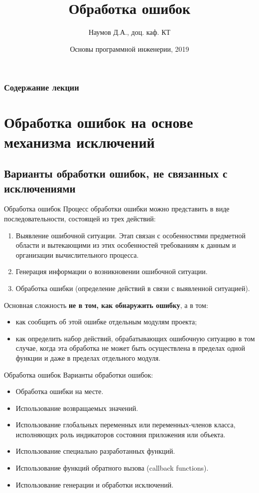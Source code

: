 \documentclass{beamer}
\title[Software Design]{Обработка ошибок}
\author{Наумов Д.А., доц. каф. КТ}
\date[21.10.2019] {Основы программной инженерии, 2019}
\begin{document}
\begin{frame}
  \titlepage
\end{frame}
  
\begin{frame}
  \frametitle{Содержание лекции}
  \tableofcontents  
\end{frame}

\section{Обработка ошибок на основе механизма исключений}

\subsection{Варианты обработки ошибок, не связанных с исключениями}

\begin{frame}{Обработка ошибок}
Процесс обработки ошибки можно представить в виде последовательности, состоящей из трех действий:
\begin{enumerate}
\item Выявление ошибочной ситуации. Этап связан с особенностями предметной области и вытекающими из этих особенностей требованиям к данным и организации вычислительного процесса.
\item Генерация информации о возникновении ошибочной ситуации.
\item Обработка ошибки (определение действий в связи с выявленной ситуацией).
\end{enumerate}
Основная сложность \textbf{не в том, как обнаружить ошибку}, а в том:
\begin{itemize}
\item как сообщить об этой ошибке отдельным модулям проекта;
\item как определить набор действий, обрабатывающих ошибочную ситуацию в том случае, когда эта обработка не может быть осуществлена в пределах одной функции и даже в пределах отдельного модуля.
\end{itemize}
\end{frame}

\begin{frame}{Обработка ошибок}
Варианты обработки ошибок:
\begin{itemize}
\item Обработка ошибки на месте.
\item Использование возвращаемых значений.
\item Использование глобальных переменных или переменных-членов класса, исполняющих роль индикаторов состояния приложения или объекта.
\item Использование специально разработанных функций.
\item Использование функций обратного вызова (callback functions).
\item Использование генерации и обработки исключений.
\end{itemize}
\end{frame}
\end{document}
